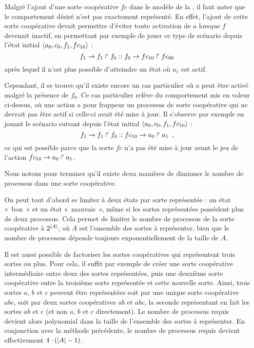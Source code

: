 \begin{example}
  Malgré l'ajout d'une sorte coopérative $fc$ dans le modèle
  de la ,
  il faut noter que le comportement désiré n'est pas exactement représenté.
  En effet, l'ajout de cette sorte coopérative devait permettre d'éviter toute activation de $a$
  lorsque $f$ devenait inactif, en permettant par exemple de jouer ce type de scénario
  depuis l'état initial $\mbox{$\langle a_0, c_0, f_1, fc_{10} \rangle$}$ :
    \[f_1\rightarrow f_1\Rsh f_0 :: f_0\rightarrow fc_{10}\Rsh fc_{00}\]
  après lequel il n'est plus possible d'atteindre un état où $a_1$ est actif.
  
  Cependant, il se trouve qu'il existe encore un cas particulier où $a$ peut être activé
  malgré la présence de $f_0$.
  Ce cas particulier relève du comportement mis en valeur ci-dessus,
  où une action a pour frappeur un processus de sorte coopérative qui ne devrait pas être
  actif si celle-ci avait été mise à jour.
  Il s'observe par exemple en jouant le scénario suivant depuis l'état initial
  $\mbox{$\langle a_0, c_0, f_1, fc_{10} \rangle$}$ :
    \[f_1\rightarrow f_1\Rsh f_0 :: fc_{10}\rightarrow a_0\Rsh a_1 \enspace,\]
  ce qui est possible parce que la sorte $fc$ n'a pas été mise à jour avant le jeu
  de l'action $fc_{10}\rightarrow a_0\Rsh a_1$.
\end{example}

\myskip

Nous notons pour terminer qu'il existe deux manières de diminuer le nombre
de processus dans une sorte coopérative.

On peut tout d'abord se limiter à deux états par sorte représentée :
un état «~bon~» et un état «~mauvais~»,
même si les sortes représentées possèdent plus de deux processus.
Cela permet de limiter le nombre de processus de la sorte coopérative à
$2^{|A|}$, où $A$ est l'ensemble des sortes à représenter,
bien que le nombre de processus dépende toujours exponentiellement de la taille de $A$.

\label{factorisation-coop}
Il est aussi possible de factoriser les sortes coopératives
qui représentent trois sortes ou plus.
Pour cela, il suffit par exemple de créer une sorte coopérative intermédiaire entre deux des
sortes représentées, puis une deuxième sorte coopérative entre
la troisième sorte représentée et cette nouvelle sorte.
Ainsi, trois sortes $a$, $b$ et $c$ peuvent être représentées soit par une unique
sorte coopérative $abc$, soit par deux sortes coopératives
$ab$ et $abc$, la seconde représentant en fait les sortes $ab$ et $c$
(et non $a$, $b$ et $c$ directement).
Le nombre de processus requis devient alors polynomial dans la taille de l'ensemble
des sortes à représenter.
En conjonction avec la méthode précédente, le nombre de processus requis devient effectivement
$4 \cdot (|A| - 1)$.



